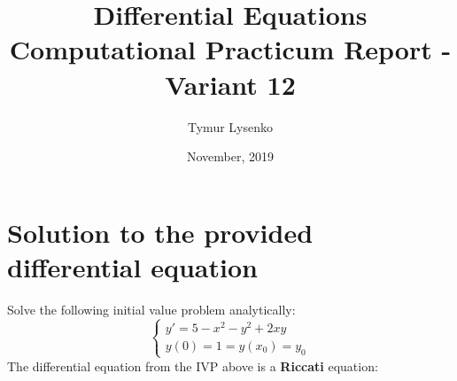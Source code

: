 \documentclass[12pt,a4paper,titlepage,twoside]{article}
\title{Differential Equations Computational Practicum Report - Variant 12}
\author{Tymur Lysenko}
\date{November, 2019}
\begin{document}
  \maketitle
  \tableofcontents
  \newpage

  \section{Solution to the provided differential equation}

  Solve the following initial value problem analytically:
  \begin{equation} \label{task_ivp}
    \begin{cases}
      y' = 5 - x^2 - y^2 + 2xy\\
      y(0) = 1 = y(x_0) = y_0
    \end{cases}
  \end{equation}
  The differential equation from the IVP above is a \textbf{Riccati} equation:
\end{document}
